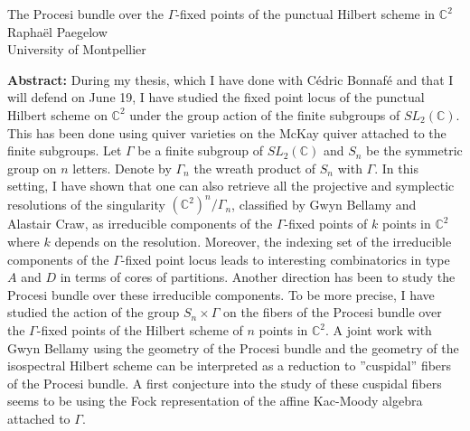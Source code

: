 \documentclass[12pt,a4paper]{article}
\begin{document}
\thispagestyle{empty} 
\begin{center}
{\large  The Procesi bundle over the ${\displaystyle \Gamma }$-fixed points of the punctual Hilbert scheme in $\mathbb{C}^2$}\\
\vspace*{.5cm}
Raphaël Paegelow\\
University of Montpellier\\
\end{center}
\vspace*{.8cm}

{\bf Abstract:} During my thesis, which I have done with C\'edric Bonnaf\'e and that I will defend on June 19, I have studied the fixed point locus of the punctual Hilbert scheme on $\mathbb{C}^2$ under the group action of the finite subgroups of $SL_2(\mathbb{C})$. This has been done using quiver varieties on the McKay quiver attached to the finite subgroups. Let $\Gamma$ be a finite subgroup of $SL_2(\mathbb{C})$ and $S_n$ be the symmetric group on $n$ letters. Denote by $\Gamma_n$ the wreath product of $S_n$ with $\Gamma$. In this setting, I have shown that one can also retrieve all the projective and symplectic resolutions of the singularity $(\mathbb{C}^2)^n/\Gamma_n$, classified by Gwyn Bellamy and Alastair Craw, as irreducible components of the $\Gamma$-fixed points of $k$ points in $\mathbb{C}^2$ where $k$ depends on the resolution. Moreover, the indexing set of the irreducible components of the $\Gamma$-fixed point locus leads to interesting combinatorics in type $A$ and $D$ in terms of cores of partitions. Another direction has been to study the Procesi bundle over these irreducible components. To be more precise, I have studied the action of the group $S_n \times \Gamma$ on the fibers of the Procesi bundle over the $\Gamma$-fixed points of the Hilbert scheme of $n$ points in $\mathbb{C}^2$. A joint work with Gwyn Bellamy using the geometry of the Procesi bundle and the geometry of the isospectral Hilbert scheme can be interpreted as a reduction to ''cuspidal'' fibers of the Procesi bundle. A first conjecture into the study of these cuspidal fibers seems to be using the Fock representation of the affine Kac-Moody algebra attached to $\Gamma$. 
\end{document}
